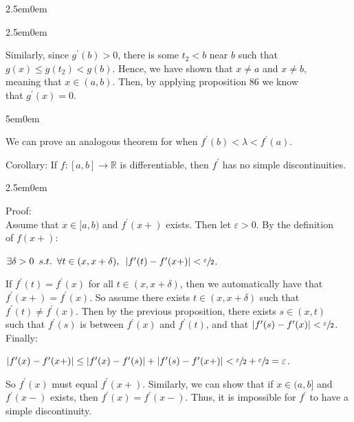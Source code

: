 \documentclass{book}
\newcommand{\hThree}{%
   \color{PineGreen!85!Orange}
   \fontsize{13}{15}\selectfont%
}
\newcommand{\teachComment}{
   \color{Orange}%
   \fontsize{12}{14}\selectfont%
}
\newenvironment{myIndent}{%
   \begin{adjustwidth}{2.5em}{0em}%
}{%
   \end{adjustwidth}%
}
\newenvironment{myDindent}{%
   \begin{adjustwidth}{5em}{0em}%
}{%
   \end{adjustwidth}%
}
\newcommand{\uuline}[2][.]{%
{\vphantom{a}\color{#1}%
\rlap{\rule[-0.18em]{\widthof{#2}}{0.06em}}%
\rlap{\rule[-0.32em]{\widthof{#2}}{0.06em}}}%
#2}
\newcommand{\suchthat}{ \hspace{0.5em}s.t.\hspace{0.5em}}
\newcommand{\myHS}{ \hspace{0.5em}}
\newcommand{\retTwo}{\hfill\bigbreak}
\begin{document}
{\begin{myIndent}
{\begin{myIndent}
      \newpage

      Similarly, since $g^\prime(b) > 0$, there is some $t_2 < b$ near $b$ such that\\ $g(x) \leq g(t_2) < g(b)$. Hence, we have shown that $x \neq a$ and $x \neq b$,\\ meaning that $x \in (a, b)$. Then, by applying proposition 86 we know\\ that $g^\prime(x) = 0$.\retTwo


      \begin{myDindent} \teachComment
         We can prove an analogous theorem for when $f^\prime(b) < \lambda < f^\prime(a)$.\retTwo
      \end{myDindent}
   \end{myIndent}}

   \uuline{Corollary}: If $f: [a, b] \longrightarrow \mathbb{R}$ is differentiable, then $f^\prime$ has no simple discontinuities.\\
   
   {\begin{myIndent}\hThree
      Proof:\\
      Assume that $x \in [a, b)$ and $f^\prime(x+)$ exists. Then let $\varepsilon > 0$. By the definition\\ of $f(x+)$:
      
      {\centering$\exists \delta > 0 \suchthat \forall t \in (x, x + \delta),\myHS |f^\prime(t) - f^\prime(x+)| < \sfrac{\varepsilon}{2}$.\retTwo\par}
      
      If $f^\prime(t) = f^\prime(x)$ for all $t \in (x, x+\delta)$, then we automatically have that\\ $f^\prime(x+) = f^\prime(x)$. So assume there exists $t \in (x, x+\delta)$ such that\\ $f^\prime(t) \neq f^\prime(x)$. Then by the previous proposition, there exists $s \in (x, t)$\\ such that $f^\prime(s)$ is between $f^\prime(x)$ and $f^\prime(t)$, and that $|f^\prime(s) - f^\prime(x)| < \sfrac{\varepsilon}{2}$.\\ Finally:

      {\centering $|f^\prime(x) - f^\prime(x+)| \leq |f^\prime(x) - f^\prime(s)| + |f^\prime(s) - f^\prime(x+)| < \sfrac{\varepsilon}{2} + \sfrac{\varepsilon}{2} = \varepsilon$.\retTwo\par}

      So $f^\prime(x)$ must equal $f^\prime(x+)$. Similarly, we can show that if $x \in (a, b]$ and\\ $f^\prime(x-)$ exists, then $f^\prime(x) = f^\prime(x-)$. Thus, it is impossible for $f^\prime$ to have a\\ simple discontinuity.\retTwo


\end{myIndent}}
\end{myIndent}}
\end{document}
